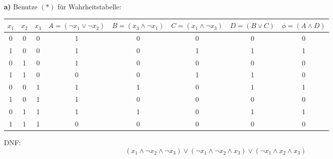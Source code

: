 \textbf{a)} Benutze $(*)$ für Wahrheitstabelle:

\begin{tabular}{ccc|ccc|cc}
$x_1$ & $x_2$ & $x_3$ & $A = (\neg x_1 \lor \neg x_2)$ & $B = (x_3 \land \neg x_1)$ & $C = (x_1 \land \neg x_3)$ & $D=(B \lor C)$ & $\phi = (A \land D)$ \\
\hline

0 & 0 & 0 & 1 & 0 & 0 & 0 & 0 \\
1 & 0 & 0 & 1 & 0 & 1 & 1 & 1 \\
0 & 1 & 0 & 1 & 0 & 0 & 0 & 0 \\
1 & 1 & 0 & 0 & 0 & 1 & 1 & 0 \\
0 & 0 & 1 & 1 & 1 & 0 & 1 & 1 \\
1 & 0 & 1 & 1 & 0 & 0 & 0 & 0 \\
0 & 1 & 1 & 1 & 1 & 0 & 1 & 1 \\
1 & 1 & 1 & 0 & 0 & 0 & 0 & 0 \\
\hline
\end{tabular}

\vspace{1em}
DNF: \[
  (x_1 \land \neg x_2 \land \neg x_3) \lor (\neg x_1 \land \neg x_2 \land x_3) \lor (\neg x_1 \land x_2 \land x_3)
\]